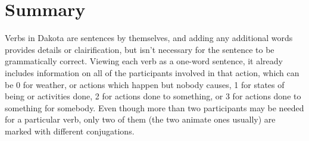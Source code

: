 \documentclass[10pt,letter]{article} %
\begin{document}
\section{Summary}
Verbs in Dakota are sentences by themselves, and adding any additional words provides details or clairification, but isn't necessary for the sentence to be grammatically correct.  Viewing each verb as a one-word sentence, it already includes information on all of the participants involved in that action, which can be 0 for weather, or actions which happen but nobody causes, 1 for states of being or activities done, 2 for actions done to something, or 3 for actions done to something for somebody.  Even though more than two participants may be needed for a particular verb, only two of them (the two animate ones usually) are marked with different conjugations.

    \nocite{*}
    
    
\end{document}
